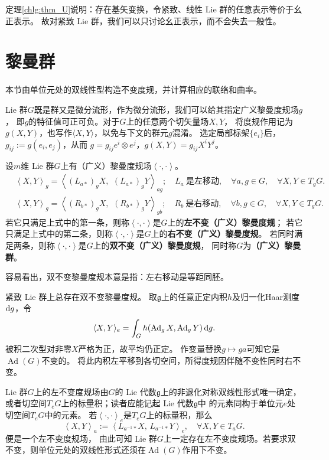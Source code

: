 定理\ref{chlg:thm_U}说明：存在基矢变换，令紧致、线性 Lie 群的任意表示等价于幺正表示。
故对紧致 Lie 群，我们可以只讨论幺正表示，而不会失去一般性。

\section{黎曼群}
本节由单位元处的双线性型构造不变度规，并计算相应的联络和曲率。

 Lie 群$G$既是群又是微分流形，作为微分流形，我们可以给其指定广义黎曼度规场$g$，
即$g$的特征值可正可负。对于$G$上的任意两个切矢量场$X,Y$，
将度规作用记为$g(X,Y)$，也写作$\langle X,Y\rangle$，以免与下文的群元$g$混淆。
选定局部标架$\{e_i\}$后，$g_{ij}:=g(e_i,e_j)$，从而
$g=g_{ij}e^i\otimes e^j$，$g(X,Y)=g_{ij}X^iY^j$。

\begin{definition}
    设$m$维 Lie 群$G$上有（广义）黎曼度规场$\left<\cdot,\cdot \right>$。
    \begin{align*}
        &\left<X,Y\right>_{g} = \left<(L_{a*})_g X,\,\ (L_{a*})_g Y \right>_{ag};
        \quad L_{a} \  \text{是左移动},\quad \forall a,g\in G, \quad \forall X,Y \in T_g G. \\
        &\left<X,Y\right>_{g} = \left<(R_{b*})_g X,\,\ (R_{b*})_g Y \right>_{gb};
        \quad R_{b} \  \text{是右移动} ,\quad \forall b,g\in G, \quad \forall X,Y \in T_g G.
    \end{align*}
    若它只满足上式中的第一条，则称$\left<\cdot,\cdot \right>$是$G$上的\textbf{左不变（广义）黎曼度规}；
    若它只满足上式中的第二条，则称$\left<\cdot,\cdot \right>$是$G$上的\textbf{右不变（广义）黎曼度规}。
    若同时满足两条，则称$\left<\cdot,\cdot \right>$是$G$上的\textbf{双不变（广义）黎曼度规}，
    同时称$G$为\textbf{（广义）黎曼群}。
\end{definition}
容易看出，双不变黎曼度规本意是指：左右移动是等距同胚。

紧致 Lie 群上总存在双不变黎曼度规。
取$\mathfrak g$上的任意正定内积$h$及归一化Haar测度$\dd g$，令
\[
    \langle X,Y\rangle_e=\int_G h(\operatorname{Ad}_gX,\operatorname{Ad}_gY)\,\dd g .
\]
被积二次型对非零$X$严格为正，故平均仍正定。
作变量替换$g\mapsto ga$可知它是$\operatorname{Ad}(G)$不变的。
将此内积左平移到各切空间，所得度规因伴随不变性同时右不变。

Lie 群$G$上的左不变度规场由$G$的 Lie 代数$\mathfrak{g}$上的非退化对称双线性形式唯一确定，
或者切空间$T_e G$上的标量积；读者应能记起 Lie 代数$\mathfrak{g}$中
的元素同构于单位元$e$处切空间$T_e G$中的元素。
若$\left<\cdot,\cdot \right>_e$是$T_e G$上的标量积，那么
\begin{equation}
    \left<X,Y\right>_a :=
    \left<L_{a^{-1}*} X,\, L_{a^{-1}*} Y \right>_e,
    \quad \forall X,Y \in T_a G.
\end{equation}
便是一个左不变度规场，
由此可知 Lie 群$G$上一定存在左不变度规场。若要求双不变，则单位元处的双线性形式还须在$\operatorname{Ad}(G)$作用下不变。

